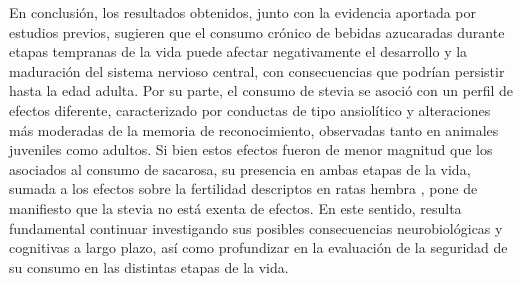 En conclusión, los resultados obtenidos, junto con la evidencia aportada por estudios previos, sugieren que el consumo crónico de bebidas azucaradas durante etapas tempranas de la vida puede afectar negativamente el desarrollo y la maduración del sistema nervioso central, con consecuencias que podrían persistir hasta la edad adulta. Por su parte, el consumo de stevia se asoció con un perfil de efectos diferente, caracterizado por conductas de tipo ansiolítico y alteraciones más moderadas de la memoria de reconocimiento, observadas tanto en animales juveniles como adultos. Si bien estos efectos fueron de menor magnitud que los asociados al consumo de sacarosa, su presencia en ambas etapas de la vida, sumada a los efectos sobre la fertilidad descriptos en ratas hembra \cite{kruse2025stevia}, pone de manifiesto que la stevia no está exenta de efectos. En este sentido, resulta fundamental continuar investigando sus posibles consecuencias neurobiológicas y cognitivas a largo plazo, así como profundizar en la evaluación de la seguridad de su consumo en las distintas etapas de la vida.
